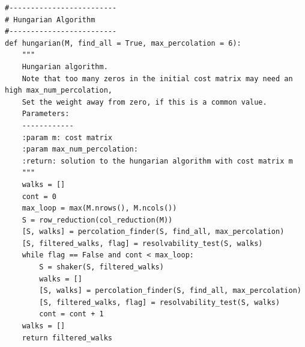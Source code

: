 \documentclass[12pt]{ClasseMatematicamente}
\begin{document}
\begin{small}
 \begin{lstlisting}
#-------------------------
# Hungarian Algorithm 
#-------------------------
def hungarian(M, find_all = True, max_percolation = 6):
	"""
	Hungarian algorithm.
	Note that too many zeros in the initial cost matrix may need an high max_num_percolation,
	Set the weight away from zero, if this is a common value.
	Parameters:
	------------
	:param m: cost matrix
	:param max_num_percolation:
	:return: solution to the hungarian algorithm with cost matrix m
	"""
    walks = []
    cont = 0
    max_loop = max(M.nrows(), M.ncols())
    S = row_reduction(col_reduction(M))
    [S, walks] = percolation_finder(S, find_all, max_percolation)
    [S, filtered_walks, flag] = resolvability_test(S, walks)
    while flag == False and cont < max_loop:
        S = shaker(S, filtered_walks)
        walks = []
        [S, walks] = percolation_finder(S, find_all, max_percolation)
        [S, filtered_walks, flag] = resolvability_test(S, walks)
        cont = cont + 1 
    walks = []         
    return filtered_walks
\end{lstlisting}
\end{small}

\end{document}
